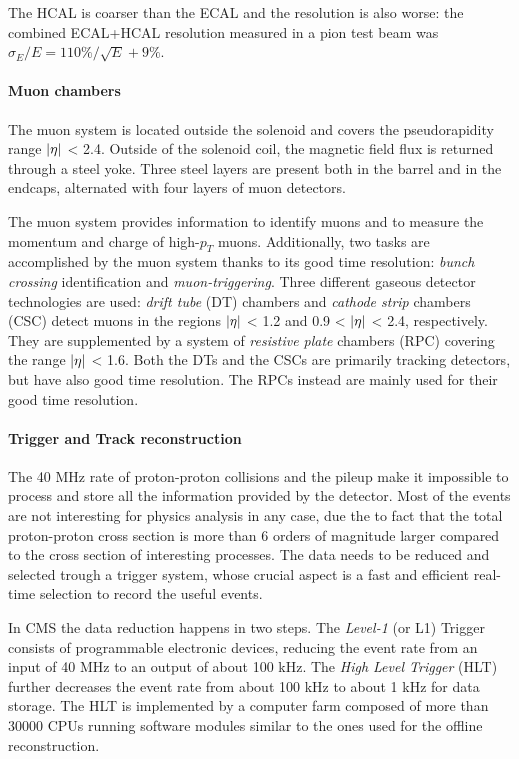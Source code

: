 \begin{outline}
    The HCAL is coarser than the ECAL and the resolution is also worse:
     the combined ECAL+HCAL resolution measured in a pion test
    beam was $\sigma_E /E = 110\%/\sqrt{E} + 9\%$.
\end{outline}

\paragraph{Muon chambers}

The muon system is located outside the solenoid and covers the pseudorapidity range
$\abs{\eta}$ < 2.4. Outside of the solenoid coil, the magnetic field flux is returned through a steel
yoke. Three steel layers are present both in the barrel and in the endcaps, alternated with
four layers of muon detectors.


The muon system provides information to identify muons and to measure the momentum
and charge of high-$p_T$ muons. Additionally, two tasks are accomplished by the muon system thanks to its good time resolution: \emph{bunch crossing} identification and \emph{muon-triggering}.
Three different gaseous detector technologies are used: \emph{drift tube} (DT) chambers and \emph{cathode strip} chambers (CSC) detect muons in the regions $\abs{\eta}$ < 1.2 and 0.9 < $\abs{\eta}$ < 2.4, respectively. They are supplemented by a system of \emph{resistive plate} chambers (RPC) covering the
range $\abs{\eta}$ < 1.6. Both the DTs and the CSCs are primarily tracking detectors, but have also
good time resolution. The RPCs instead are mainly used for their good time resolution.


\paragraph{Trigger and Track reconstruction}

The 40 MHz rate of proton-proton collisions and the pileup make it impossible to process
and store all the information provided by the detector. Most of the events are not interesting
for physics analysis in any case, due the to fact that the total proton-proton cross section
is more than 6 orders of magnitude larger compared to the cross section of interesting processes. The data needs to be reduced and selected trough a trigger system, whose crucial
aspect is a fast and efficient real-time selection to record the useful events.

In CMS the data reduction happens in two steps. The \emph{Level-1} (or L1) Trigger consists of programmable electronic devices, reducing  the event rate from an input of 40 MHz to an output of about 100 kHz. The
\emph{High Level Trigger} (HLT) further decreases the event rate from about 100 kHz to about 1 kHz for data storage. The HLT is implemented by a computer farm composed of more than 30000 CPUs
running software modules similar to the ones used for the offline reconstruction. 

